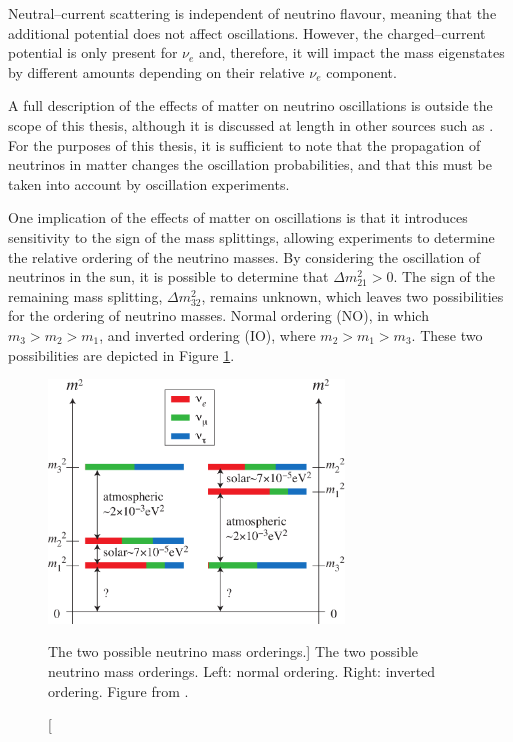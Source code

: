 Neutral--current scattering is independent of neutrino flavour, meaning that
the additional potential does not affect oscillations. However, the 
charged--current potential is only present for $\nu_e$ and, therefore, it will
impact the mass eigenstates by different amounts depending on their relative 
$\nu_e$ component.

A full description of the effects of matter on neutrino oscillations is outside
the scope of this thesis, although it is discussed at length in other sources
such as \cite{GiuntiCarlo2007FoNP}. For the purposes of this thesis, it is
sufficient to note that the propagation of neutrinos in matter changes the
oscillation probabilities, and that this must be taken into account by 
oscillation experiments.

One implication of the effects of matter on oscillations is that it introduces
sensitivity to the sign of the mass splittings\cite{GiuntiCarlo2007FoNP}, 
allowing experiments to determine the relative ordering of the neutrino 
masses. By considering the oscillation of neutrinos in the sun, it is 
possible to determine that $\Delta m_{21}^2 > 0$\cite{PhysRevD.98.030001}. 
The sign of the remaining mass splitting, $\Delta m_{32}^2$, remains unknown,
which leaves two possibilities for the ordering of neutrino masses. Normal 
ordering (NO), in which $m_3 > m_2 > m_1$, and inverted ordering (IO), where $m_2 > m_1 
> m_3$. These two possibilities are depicted in Figure \ref{fig:mass_ordering}. 
\begin{figure}
	\centering
	\includegraphics[width=0.7\textwidth]{figures/mass.pdf}
	\caption
	[The two possible neutrino mass orderings.]
	{The two possible neutrino mass orderings. Left: normal ordering. Right: 
	inverted ordering. Figure from \cite{SKing}.}
	\label{fig:mass_ordering}
\end{figure}

